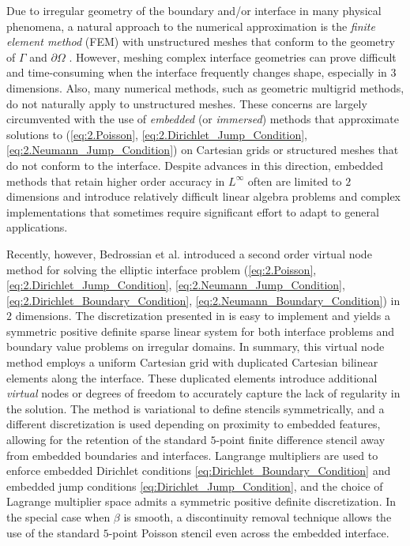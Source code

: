 Due to irregular geometry of the boundary and/or interface in many physical phenomena, a natural approach to the numerical approximation is the \emph{finite element method} (FEM) with unstructured meshes that conform to the geometry of $\Gamma$ and $\partial\Omega$ \cite{Babuska70,Bramble96,Chen.Zhiming96,Dryja05,Cockburn09,Wohlmuth99,Huang02,Lamichhane04}. However, meshing complex interface geometries can prove difficult and time-consuming when the interface frequently changes shape, especially in $3$ dimensions. Also, many numerical methods, such as geometric multigrid methods, do not naturally apply to unstructured meshes. These concerns are largely circumvented with the use of \emph{embedded} (or \emph{immersed}) methods that approximate solutions to (\ref{eq:2.Poisson}, \ref{eq:2.Dirichlet_Jump_Condition}, \ref{eq:2.Neumann_Jump_Condition}) on Cartesian grids or structured meshes that do not conform to the interface. Despite advances in this direction, embedded methods that retain higher order accuracy in $L^{\infty}$ often are limited to $2$ dimensions and introduce relatively difficult linear algebra problems and complex implementations that sometimes require significant effort to adapt to general applications.

Recently, however, Bedrossian et al. \cite{Bedrossian10} introduced a second order virtual node method for solving the elliptic interface problem (\ref{eq:2.Poisson}, \ref{eq:2.Dirichlet_Jump_Condition}, \ref{eq:2.Neumann_Jump_Condition}, \ref{eq:2.Dirichlet_Boundary_Condition}, \ref{eq:2.Neumann_Boundary_Condition}) in $2$ dimensions. The discretization presented in \cite{Bedrossian10} is easy to implement and yields a symmetric positive definite sparse linear system for both interface problems and boundary value problems on irregular domains. In summary, this virtual node method employs a uniform Cartesian grid with duplicated Cartesian bilinear elements along the interface. These duplicated elements introduce additional \emph{virtual} nodes or degrees of freedom to accurately capture the lack of regularity in the solution. The method is variational to define stencils symmetrically, and a different discretization is used depending on proximity to embedded features, allowing for the retention of the standard $5$-point finite difference stencil away from embedded boundaries and interfaces. Langrange multipliers are used to enforce embedded Dirichlet conditions \eqref{eq:Dirichlet_Boundary_Condition} and embedded jump conditions \eqref{eq:Dirichlet_Jump_Condition}, and the choice of Lagrange multiplier space admits a symmetric positive definite discretization. In the special case when $\beta$ is smooth, a discontinuity removal technique allows the use of the standard $5$-point Poisson stencil even across the embedded interface.

